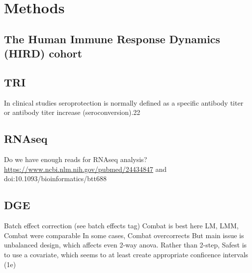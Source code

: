 \section{Methods}

\subsection{The Human Immune Response Dynamics (HIRD) cohort}

\subsection{TRI}

In clinical studies seroprotection is normally defined as a specific antibody titer or antibody titer increase (seroconversion).22

\subsection{RNAseq}

Do we have enough reads for RNAseq analysis? \url{https://www.ncbi.nlm.nih.gov/pubmed/24434847} and doi:10.1093/bioinformatics/btt688

\subsection{DGE}

Batch effect correction (see batch effects tag)
Combat is best here
LM, LMM, Combat were comparable
In some cases, Combat overcorrects
But main issue is unbalanced design, which affects even 2-way anova. Rather than 2-step, Safest is to use a covariate, which seems to at least create appropriate conficence intervals (1e)


